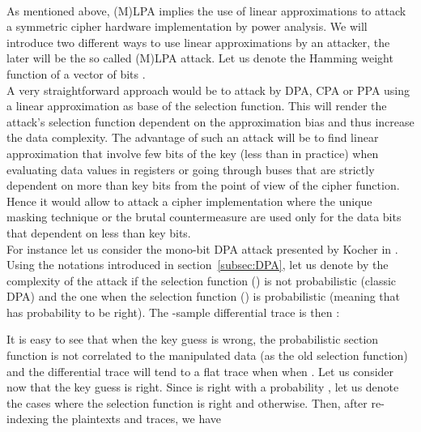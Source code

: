 \documentclass[11pt,a4paper]{article}
\begin{document}
{{{{{{{{{\paragraph{}
As mentioned above, (M)LPA implies the use of linear approximations to attack a symmetric cipher hardware implementation by power analysis. We will introduce two different ways to 
use linear approximations by an attacker, the later will be the so called (M)LPA attack. Let us denote  the Hamming weight function of a vector of bits .
\vspace{1ex} \\
A very straightforward approach would be to attack by DPA, CPA or PPA using a linear approximation as base of the selection function. This will render the attack's selection function dependent on 
the approximation bias  and thus increase the data complexity. The advantage of such an attack will be to find linear approximation 
that involve few bits of the key (less than  in practice) when evaluating data values in registers or going through buses that are strictly dependent on more than 
 key bits from the point of view of the cipher function. Hence it would allow to attack a cipher implementation where the unique masking technique or
the brutal countermeasure are used only for the data bits that dependent on less than  key bits. \\
For instance let us consider the mono-bit DPA attack presented by Kocher in \cite{Kocher98}. Using the notations introduced in section~\ref{subsec:DPA}, 
let us denote by  the complexity of the attack if the selection function () is not probabilistic (classic DPA) and  the one when the selection function () 
is probabilistic (meaning that  has probability  to be right). The -sample differential trace  is then : 

It is easy to see that when the key guess is wrong, the probabilistic section function is not correlated to the manipulated data (as the old selection function) and 
the differential trace will tend to a flat trace when when . Let us consider now that the key guess is right. Since  is right with a probability , 
let us denote  the cases where the selection function is right and  otherwise. Then, after re-indexing the plaintexts and traces, we have 

}}}}}}}}}
\end{document}
